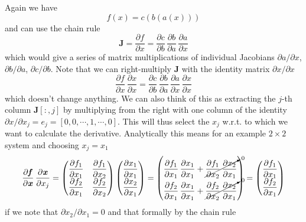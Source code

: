 \documentclass[paper=a4,11pt,headsepline]{scrartcl}
\newcommand{\ve}[1]{\ensuremath{\bm{\mathit{#1}}}}
\newcommand{\ma}[1]{\ensuremath{\bm{\mathbf{#1}}}}
\newcommand{\pd}[2]{\dfrac{\partial #1}{\partial #2}}
\newcommand{\pdi}[2]{\partial #1/\partial #2}
\begin{document}
Again we have
\begin{equation*}
    \ve f(\ve x) = \ve c(\ve b(\ve a(\ve x)))
\end{equation*}
and can use the chain rule
\begin{equation*}
    \ma J=\pd{\ve f}{\ve x} = \pd{\ve c}{\ve b}\,\pd{\ve b}{\ve a}\,\pd{\ve a}{\ve x}
\end{equation*}
which would give a series of matrix multiplications of individual Jacobians $\pdi{\ve
a}{\ve x}$, $\pdi{\ve b}{\ve a}$, $\pdi{\ve c}{\ve b}$.
Note that we can right-multiply $\ma J$ with the identity
matrix $\pdi{\ve x}{\ve x}$
\begin{equation*}
    \pd{\ve f}{\ve x}\,\pd{\ve x}{\ve x} =
    \pd{\ve c}{\ve b}\,\pd{\ve b}{\ve a}\,\pd{\ve a}{\ve x}\,\pd{\ve x}{\ve x}
\end{equation*}
which doesn't change anything. We can also think of this as extracting the
$j$-th column $\ma J[:,j]$ by multiplying from the right with one column of the
identity $\partial\ve x/\partial x_j = \ve e_j = [0,0,\cdots,1,\cdots, 0]$.
This will thus select the $x_j$ w.r.t. to which we want to calculate the
derivative. Analytically this means for an example $2\times 2$ system and choosing
$x_j = x_1$
\begin{equation*}
    \pd{\ve f}{\ve x}\,\pd{\ve x}{x_j}=
    \begin{pmatrix}
        \pd{f_1}{x_1} & \pd{f_1}{x_2} \\
        \pd{f_2}{x_1} & \pd{f_2}{x_2} \\
    \end{pmatrix}
    \begin{pmatrix}
        \pd{x_1}{x_1} \\
        \pd{x_2}{x_1} \\
    \end{pmatrix}
    =
    \begin{pmatrix}
        \pd{f_1}{x_1}\,\pd{x_1}{x_1} + \cancelto{0}{\pd{f_1}{x_2}\,\pd{x_2}{x_1}} \\
        \pd{f_2}{x_1}\,\pd{x_1}{x_1} + \cancelto{0}{\pd{f_2}{x_2}\,\pd{x_2}{x_1}} \\
    \end{pmatrix}
    =
    \begin{pmatrix}
        \pd{f_1}{x_1} \\
        \pd{f_2}{x_1} \\
    \end{pmatrix}
\end{equation*}
if we note that $\pdi{x_2}{x_1}=0$ and that formally by the chain rule
\end{document}
